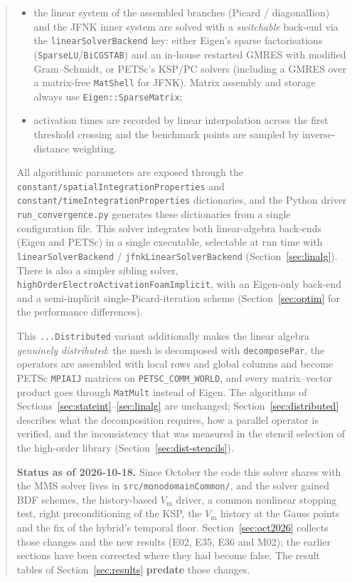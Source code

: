 \documentclass[11pt,a4paper]{article}
\newcommand{\code}[1]{\texttt{\small #1}}
\newcommand{\Vm}{V_{\text{m}}}
\begin{document}
\begin{abstract}
\begin{itemize}
Newton--Krylov (JFNK) method with Armijo backtracking line search,
an initial guess by linear extrapolation and a physical bracket \emph{clamp}
on the input to the ionic ODE;
\item the linear system of the assembled branches (Picard / diagonalIion) and the
JFNK inner system are solved with a \emph{switchable} back-end via the
\code{linearSolverBackend} key: either Eigen's sparse factorisations
(\code{SparseLU}/\code{BiCGSTAB}) and an in-house restarted GMRES with modified
Gram--Schmidt, or PETSc's KSP/PC solvers (including a GMRES over a matrix-free
\code{MatShell} for JFNK). Matrix assembly and storage always use
\code{Eigen::SparseMatrix};
\item activation times are recorded by linear interpolation
across the first threshold crossing and the benchmark points are sampled by
inverse-distance weighting.
\end{itemize}
 
All algorithmic parameters are exposed
through the \code{constant/spatialIntegrationProperties} and
\code{constant/timeIntegrationProperties} dictionaries, and the Python driver
\code{run\_convergence.py} generates these dictionaries from a single
configuration file. This solver integrates both linear-algebra back-ends (Eigen and
PETSc) in a single executable, selectable at run time with
\code{linearSolverBackend} / \code{jfnkLinearSolverBackend}
(Section~\ref{sec:linalg}). There is also a simpler sibling solver,
\code{highOrderElectroActivationFoamImplicit}, with an Eigen-only back-end and a
semi-implicit single-Picard-iteration scheme (Section~\ref{sec:optim} for the
performance differences).

This \code{...Distributed} variant additionally makes the linear algebra
\emph{genuinely distributed}: the mesh is decomposed with \code{decomposePar},
the operators are assembled with local rows and global columns and become PETSc
\code{MPIAIJ} matrices on \code{PETSC\_COMM\_WORLD}, and every matrix--vector
product goes through \code{MatMult} instead of Eigen. The algorithms of
Sections~\ref{sec:stateint}--\ref{sec:linalg} are unchanged;
Section~\ref{sec:distributed} describes what the decomposition requires, how a
parallel operator is verified, and the inconsistency that was measured in the
stencil selection of the high-order library (Section~\ref{sec:dist-stencils}).

\textbf{Status as of 2026-10-18.} Since October the code this solver shares with
the MMS solver lives in \code{src/monodomainCommon/}, and the solver gained BDF
schemes, the history-based $\Vm$ driver, a common nonlinear stopping test, right
preconditioning of the KSP, the $\Vm$ history at the Gauss points and the fix of
the hybrid's temporal floor. Section~\ref{sec:oct2026} collects those changes and
the new results (E02, E35, E36 and M02); the earlier sections have been corrected
where they had become false. The result tables of Section~\ref{sec:results}
\textbf{predate} those changes.
\end{abstract}
\end{document}

